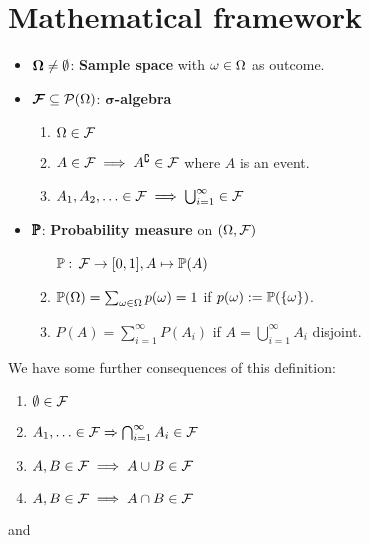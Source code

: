 \section{Mathematical framework}

\begin{definition*}
  \begin{itemize}
    \item \(\bm{\O} \neq \emptyset\): \textbf{Sample space} with \(\omega \in \O\) as outcome.
    \item \(\bm{\F}\subseteq \Pow(\O)\): \textbf{\(\bm{\sigma}\)-algebra}
    \begin{enumerate}
      \item \(\Omega \in \F\)
      \item \(A \in \F \implies A^\complement \in \F\) where \(A\) is an event.
      \item \(A_1, A_2, \ldots \in \F \implies \bigcup_{i=1}^\infty \in \F\)
    \end{enumerate}
    \item \(\pmb{\P}\): \textbf{Probability measure} on \((\O, \F)\)
    \begin{enumerate}
      \item[\(\P:\)] \(\F \to [0, 1], A \mapsto \P(A)\)
      \item \(\P(\O) = \sum_{\omega \in \O} p(\omega) = 1\) if \(p(\omega) := \P(\{\omega\})\).
      \item \(P(A) = \sum_{i=1}^\infty P(A_i)\) if \(A = \bigcup_{i=1}^\infty A_i\) disjoint.
    \end{enumerate}
  \end{itemize}
\end{definition*}

We have some further consequences of this definition:
\begin{enumerate}
  \item \(\emptyset \in \F\)
  \item \(A_1, \ldots \in \F \Rightarrow \bigcap_{i=1}^\infty A_i \in \F\)
  \item \(A, B \in \F \implies A \cup B \in \F\)
  \item \(A, B \in \F \implies A \cap B \in \F\)
\end{enumerate}

and


